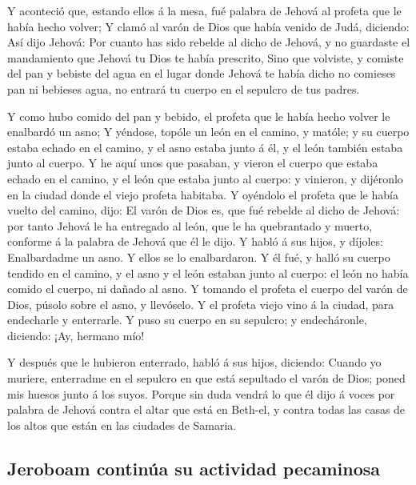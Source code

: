  Y aconteció que, estando ellos á la mesa, fué palabra de
Jehová al profeta que le había hecho volver;  Y clamó al
varón de Dios que había venido de Judá, diciendo: Así dijo Jehová: Por
cuanto has sido rebelde al dicho de Jehová, y no guardaste el
mandamiento que Jehová tu Dios te había prescrito,  Sino
que volviste, y comiste del pan y bebiste del agua en el lugar donde
Jehová te había dicho no comieses pan ni bebieses agua, no entrará tu
cuerpo en el sepulcro de tus padres.

 Y como hubo comido del pan y bebido, el profeta que le
había hecho volver le enalbardó un asno;  Y yéndose,
topóle un león en el camino, y matóle; y su cuerpo estaba echado en el
camino, y el asno estaba junto á él, y el león también estaba junto al
cuerpo.  Y he aquí unos que pasaban, y vieron el cuerpo
que estaba echado en el camino, y el león que estaba junto al cuerpo: y
vinieron, y dijéronlo en la ciudad donde el viejo profeta habitaba.
 Y oyéndolo el profeta que le había vuelto del camino,
dijo: El varón de Dios es, que fué rebelde al dicho de Jehová: por tanto
Jehová le ha entregado al león, que le ha quebrantado y muerto, conforme
á la palabra de Jehová que él le dijo.  Y habló á sus
hijos, y díjoles: Enalbardadme un asno. Y ellos se lo enalbardaron.
 Y él fué, y halló su cuerpo tendido en el camino, y el
asno y el león estaban junto al cuerpo: el león no había comido el
cuerpo, ni dañado al asno.  Y tomando el profeta el
cuerpo del varón de Dios, púsolo sobre el asno, y llevóselo. Y el
profeta viejo vino á la ciudad, para endecharle y enterrarle.
 Y puso su cuerpo en su sepulcro; y endecháronle,
diciendo: ¡Ay, hermano mío!

 Y después que le hubieron enterrado, habló á sus hijos,
diciendo: Cuando yo muriere, enterradme en el sepulcro en que está
sepultado el varón de Dios; poned mis huesos junto á los suyos.
 Porque sin duda vendrá lo que él dijo á voces por
palabra de Jehová contra el altar que está en Beth-el, y contra todas
las casas de los altos que están en las ciudades de Samaria.

\hypertarget{jeroboam-continuxfaa-su-actividad-pecaminosa}{%
\subsection{Jeroboam continúa su actividad
pecaminosa}\label{jeroboam-continuxfaa-su-actividad-pecaminosa}}

